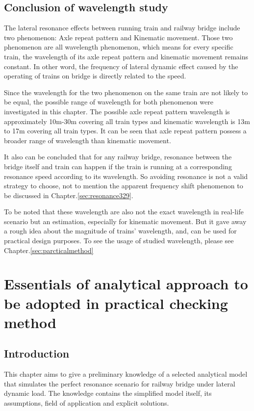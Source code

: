 \section{Conclusion of wavelength study}

The lateral resonance effects between running train and railway bridge include two phenomenon: Axle repeat pattern and Kinematic movement. Those two phenomenon are all wavelength phenomenon, which means for every specific train, the wavelength of its axle repeat pattern and kinematic movement remains constant. In other word, the frequency of lateral dynamic effect caused by the operating of trains on bridge is directly related to the speed.

Since the wavelength for the two phenomenon on the same train are not likely to be equal, the possible range of wavelength for both phenomenon were investigated in this chapter. The possible axle repeat pattern wavelength is approximately 10m-30m covering all train types and kinematic wavelength is 13m to 17m covering all train types. It can be seen that axle repeat pattern possess a broader range of wavelength than kinematic movement.

It also can be concluded that for any railway bridge, resonance between the bridge itself and train can happen if the train is running at a corresponding resonance speed according to its wavelength. So avoiding resonance is not a valid strategy to choose, not to mention the apparent frequency shift phenomenon to be discussed in Chapter.\ref{sec:resonance329}. 

To be noted that these wavelength are also not the exact wavelength in real-life scenario but an estimation, especially for kinematic movement. But it gave away a rough idea about the magnitude of trains' wavelength, and, can be used for practical design purposes. To see the usage of studied wavelength, please see Chapter.\ref{sec:parcticalmethod}



\chapter{Essentials of analytical approach to be adopted in practical checking method}\label{sec:analyticalmodel}
 
\section{Introduction}
This chapter aims to give a preliminary knowledge of a selected analytical model that simulates the perfect resonance scenario for railway bridge under lateral dynamic load. The knowledge contains the simplified model itself, its assumptions, field of application and explicit solutions. 

